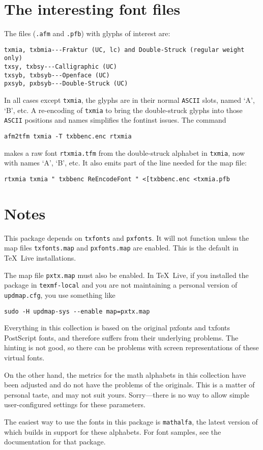 \documentclass[11pt]{amsart}
\begin{document}
\section{The interesting font files}
The files ({\tt.afm} and {\tt.pfb}) with glyphs of interest are:
\begin{verbatim}
txmia, txbmia---Fraktur (UC, lc) and Double-Struck (regular weight only)
txsy, txbsy---Calligraphic (UC)
txsyb, txbsyb---Openface (UC)
pxsyb, pxbsyb---Double-Struck (UC)
\end{verbatim}

In all cases except {\tt txmia}, the glyphs are in their normal {\tt\small ASCII} slots, named `A', `B', etc. A re-encoding of {\tt txmia} to bring the double-struck glyphs into those {\tt\small ASCII} positions and names simplifies the \textsf{fontinst} issues. The command
\begin{verbatim}
afm2tfm txmia -T txbbenc.enc rtxmia
\end{verbatim}
makes a raw font {\tt rtxmia.tfm} from the double-struck alphabet in {\tt txmia}, now with names `A', `B', etc. It also emits part of the line needed for the map file:
\begin{verbatim}
rtxmia txmia " txbbenc ReEncodeFont " <[txbbenc.enc <txmia.pfb
\end{verbatim}
\section{Notes}
This package depends on {\tt txfonts} and {\tt pxfonts}. It will not function unless the map files {\tt txfonts.map} and {\tt pxfonts.map} are enabled. This is the default in \TeX\ Live installations.

The map file {\tt pxtx.map} must also be enabled. In \TeX\ Live, if you installed the package in {\tt texmf-local} and you are not maintaining a personal version of {\tt updmap.cfg}, you use something like
\begin{verbatim}
sudo -H updmap-sys --enable map=pxtx.map
\end{verbatim}

Everything in this collection is based on the original pxfonts and txfonts PostScript fonts, and therefore suffers from their underlying problems. The hinting is not good, so there can be problems with screen representations of these virtual fonts. 

On the other hand, the metrics for the math alphabets in this collection have been adjusted and do not have the problems of the originals. This is a matter of personal taste, and may not suit yours. Sorry---there is no way to allow simple user-configured settings for these parameters.

The easiest way to use the fonts in this package is {\tt mathalfa}, the latest version of which builds in support for these alphabets. For font samples, see the documentation for that package.
\end{document}
